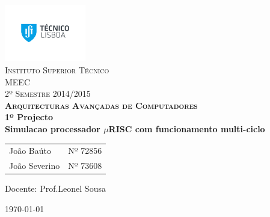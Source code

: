 \begin{titlepage}
	
	\begin{center}
		
		\includegraphics[trim = 4cm 4cm 4cm 4cm, keepaspectratio=true, height=2.5cm]{./images/IST_LOGO.pdf}~\\[0.5cm]
		
		\textsc{\LARGE Instituto Superior Técnico\\[0.5cm]
		               MEEC\\[0.5cm]
		               2º Semestre 2014/2015\\[2cm]
		               \huge \bfseries Arquitecturas Avançadas de Computadores}\\[1cm]
		
		\huge \bfseries 1º Projecto \\[1cm]
		\huge \bfseries Simulacao processador $\mu$RISC com funcionamento	multi-ciclo
		\\[0.5cm]
		\vfill
		\large
\begin{tabular}{l r}
João Baúto &  Nº 72856\\
João Severino & Nº 73608\\
\end{tabular}

		\vfill
		\begin{center}
		Docente: Prof.Leonel Sousa
		\end{center}
		\vfill
		{\large \today}

	\end{center}
	
	\cleardoublepage
	\setcounter{page}{1}
\end{titlepage}
